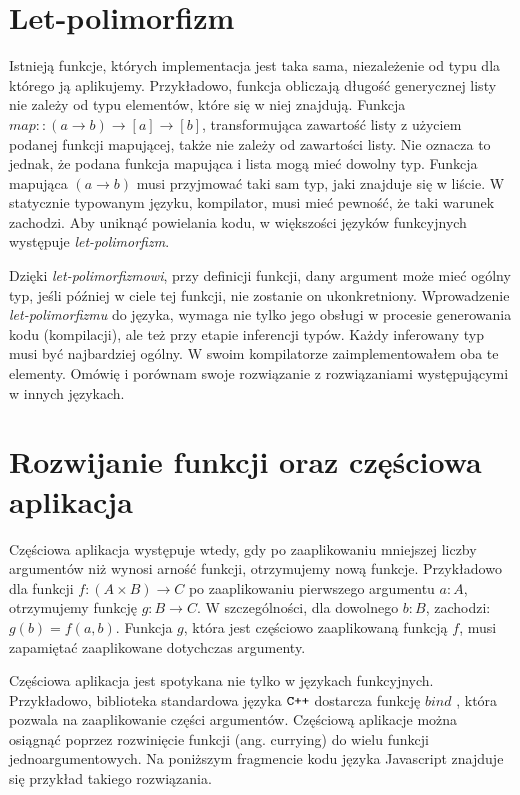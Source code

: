 \documentclass[declaration,shortabstract]{iithesis}
\begin{document}
\section{Let-polimorfizm}

Istnieją funkcje, których implementacja jest taka sama, niezależenie od typu dla
którego ją aplikujemy. Przykładowo, funkcja obliczają długość generycznej listy 
nie zależy od typu elementów, które się w niej znajdują. Funkcja $map :: (a 
\rightarrow b) \rightarrow [a] \rightarrow [b]$, transformująca zawartość listy 
z użyciem podanej funkcji mapującej, także nie zależy od zawartości listy. Nie 
oznacza to jednak, że podana funkcja mapująca i lista mogą mieć dowolny typ. 
Funkcja mapująca $(a \rightarrow b)$ musi przyjmować taki sam typ, jaki znajduje się w liście. W statycznie typowanym języku, kompilator, musi mieć 
pewność, że taki warunek zachodzi. Aby uniknąć powielania kodu, w większości języków funkcyjnych 
występuje \textit{let-polimorfizm}. 

Dzięki \textit{let-polimorfizmowi}, przy definicji funkcji, dany argument może 
mieć \newline ogólny typ, jeśli później w ciele tej funkcji, nie zostanie on
ukonkretniony. 
Wprowadzenie \textit{let-polimorfizmu} do języka, wymaga nie tylko jego obsługi 
w procesie generowania kodu (kompilacji), ale też przy etapie inferencji typów.
Każdy inferowany typ musi być najbardziej ogólny. W swoim kompilatorze 
zaimplementowałem oba te elementy. Omówię i porównam swoje rozwiązanie z rozwiązaniami występującymi w innych językach.


\section{Rozwijanie funkcji oraz częściowa aplikacja}

Częściowa aplikacja występuje wtedy, gdy po zaaplikowaniu mniejszej liczby 
argumentów niż wynosi arność funkcji, otrzymujemy nową funkcje. Przykładowo 
dla funkcji $f: (A \times B) \rightarrow C$ po zaaplikowaniu pierwszego 
argumentu $a : A$, otrzymujemy funkcję $g : B \rightarrow C$. W szczególności,
dla dowolnego $b : B$, zachodzi: $g(b) = f(a, b)$. Funkcja $g$, która jest 
częściowo zaaplikowaną funkcją $f$, musi zapamiętać zaaplikowane dotychczas 
argumenty. 

Częściowa aplikacja jest spotykana nie tylko w językach funkcyjnych. 
Przykładowo, biblioteka standardowa języka $\verb!C++!$ dostarcza funkcję
$bind$ \cite{cpp_bind}, która pozwala na zaaplikowanie części argumentów. 
Częściową aplikacje można osiągnąć poprzez rozwinięcie funkcji (ang. currying) 
do wielu funkcji jednoargumentowych. Na poniższym fragmencie kodu języka 
Javascript znajduje się przykład takiego rozwiązania.
\end{document}
